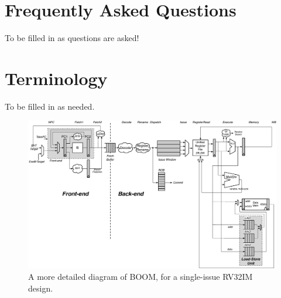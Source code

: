 \documentclass[11pt, notitlepage]{report}
\begin{document}
\appendix



\chapter{Frequently Asked Questions}

To be filled in as questions are asked!


\chapter{Terminology}

To be filled in as needed.




\begin{figure}[ht]
	\centering
	\centerline{\includegraphics[scale =.9, angle=90] {figures/simple_boom_pipeline}}
	\caption{ \small A more detailed diagram of BOOM, for a single-issue RV32IM design.}
	\label{fig:boom-detailed}
\end{figure}








\end{document}
